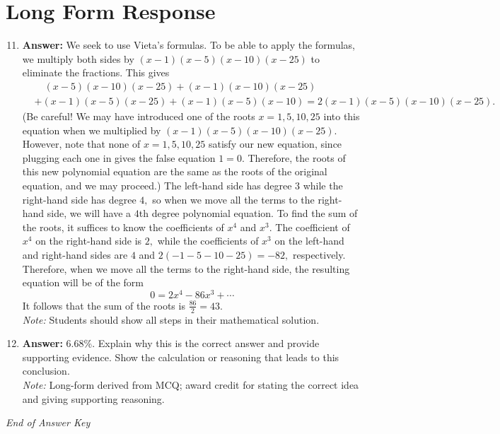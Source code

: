 \documentclass[12pt]{article}
\begin{document}
\section*{Long Form Response}
\begin{enumerate}[label=\arabic*.]
\setcounter{enumi}{10}
\item \textbf{Answer:} We seek to use Vieta's formulas. To be able to apply the formulas, we multiply both sides by $(x-1)(x-5)(x-10)(x-25)$ to eliminate the fractions. This gives \[\begin{aligned}&\quad (x-5)(x-10)(x-25) + (x-1)(x-10)(x-25) \\& + (x-1)(x-5)(x-25) + (x-1)(x-5)(x-10) = 2(x-1)(x-5)(x-10)(x-25). \end{aligned}\](Be careful! We may have introduced one of the roots $x = 1, 5, 10, 25$ into this equation when we multiplied by $(x-1)(x-5)(x-10)(x-25).$ However, note that none of $x = 1, 5, 10, 25$ satisfy our new equation, since plugging each one in gives the false equation $1=0.$ Therefore, the roots of this new polynomial equation are the same as the roots of the original equation, and we may proceed.) The left-hand side has degree $3$ while the right-hand side has degree $4,$ so when we move all the terms to the right-hand side, we will have a $4$th degree polynomial equation. To find the sum of the roots, it suffices to know the coefficients of $x^4$ and $x^3.$ The coefficient of $x^4$ on the right-hand side is $2,$ while the coefficients of $x^3$ on the left-hand and right-hand sides are $4$ and $2(-1-5-10-25) = -82,$ respectively. Therefore, when we move all the terms to the right-hand side, the resulting equation will be of the form \[ 0 = 2 x^4 - 86 x^3 + \cdots\]It follows that the sum of the roots is $\tfrac{86}{2} = \boxed{43}.$
\\ \textit{Note:} Students should show all steps in their mathematical solution.
\item \textbf{Answer:} 6.68\%. Explain why this is the correct answer and provide supporting evidence. Show the calculation or reasoning that leads to this conclusion.
\\ \textit{Note:} Long-form derived from MCQ; award credit for stating the correct idea and giving supporting reasoning.
\end{enumerate}

\vfill
\noindent\textit{End of Answer Key}
\end{document}
